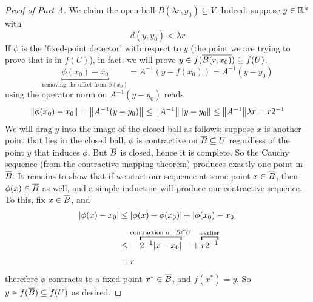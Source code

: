 \documentclass[../main-manifolds.tex]{subfiles}
\begin{document}
\begin{proof}[Proof of Part A]
    We claim the open ball $B(\lambda r, y_0)\subseteq V$. Indeed, suppose $y\in{\mathbb{R}^n}$ with 
    \[
        d(y,y_0) < \lambda r
    \]
    If $\phi$ is the 'fixed-point detector' with respect to $y$ (the point we are trying to prove that is in $f(U)$), in fact: we will prove $y\in f(\overline{B(r,x_0)})\subseteq f(U)$.
    \[
        \underbracket{\phi(x_0) - x_0}_{\text{removing the offset from }\phi(x_0)} = A^{-1}(y - f(x_0)) = A^{-1}(y - y_0)
    \]
    using the operator norm on $A^{-1}(y-y_0)$ reads
    \[
        \norm{\phi(x_0) - x_0} = \norm{A^{-1}(y-y_0)}\leq \norm{A^{-1}}\norm{y-y_0}\leq \norm{A^{-1}}\lambda r = r2^{-1}
    \]
    We will drag $y$ into the image of the closed ball as follows: suppose $x$ is another point that lies in the closed ball, $\phi$ is contractive on $\overline{B}\subseteq U$ regardless of the point $y$ that induces $\phi$. But $\overline{B}$ is closed, hence it is complete. So the Cauchy sequence (from the contractive mapping theorem) produces exactly one point in $\overline{B}$. It remains to show that if we start our sequence at some point $x\in \overline{B}$, then $\phi(x)\in\overline{B}$ as well, and a simple induction will produce our contractive sequence.\\


    To this, fix $x\in \overline{B}$, and 
    \begin{align*}
        |\phi(x)-x_0|&\leq |\phi(x)-\phi(x_0)| + |\phi(x_0)-x_0|\\[1ex]
        &\leq \overbracket{2^{-1}|x-x_0|}^{\text{contraction on } \cl{B}\subseteq U} + \overbracket{r2^{-1}}^{\text{earlier}} \\[1ex]
        &= r
    \end{align*}
    therefore $\phi$ contracts to a fixed point $x^*\in \overline{B}$, and $f(x^*)=y$. So $y\in f(\overline{B})\subseteq f(U)$ as desired.
\end{proof}
\end{document}
